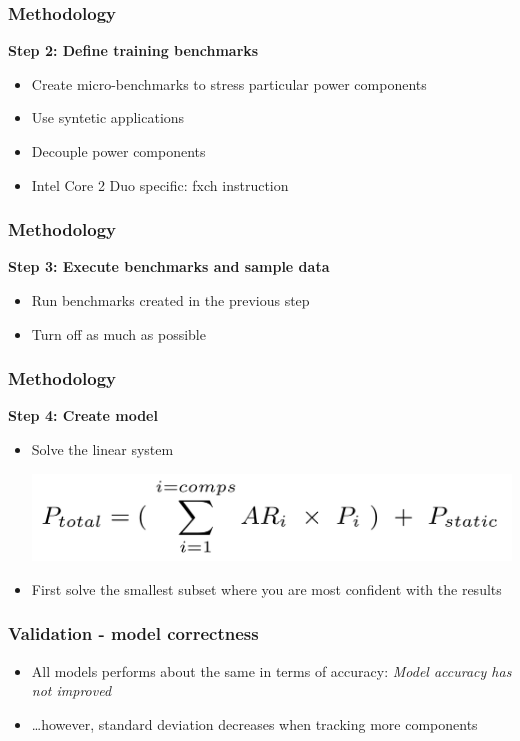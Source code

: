 \documentclass[screen]{beamer}
\begin{document}
\begin{frame}
    \frametitle{Methodology}
    \textbf{Step 2: Define training benchmarks}

    \begin{itemize}
        \item Create micro-benchmarks to stress particular power components
        \item Use syntetic applications
        \item Decouple power components
        \item Intel Core 2 Duo specific: fxch instruction
    \end{itemize}


\end{frame}
\begin{frame}
    \frametitle{Methodology}
    \textbf{Step 3: Execute benchmarks and sample data}

    \begin{itemize}
        \item Run benchmarks created in the previous step
        \item Turn off as much as possible
    \end{itemize}
\end{frame}

\begin{frame}
    \frametitle{Methodology}
    \textbf{Step 4: Create model}

    \begin{itemize}
        \item Solve the linear system

            \includegraphics{Eq1}

        \item First solve the smallest subset where you are most confident with the results
    \end{itemize}

\end{frame}

\begin{frame}
    \frametitle{Validation - model correctness}

    \begin{itemize}
        \item All models performs about the same in terms of accuracy: \emph{Model accuracy has not improved}
        \item \ldots however, standard deviation decreases when tracking more components
    \end{itemize}

\end{frame}
\end{document}
